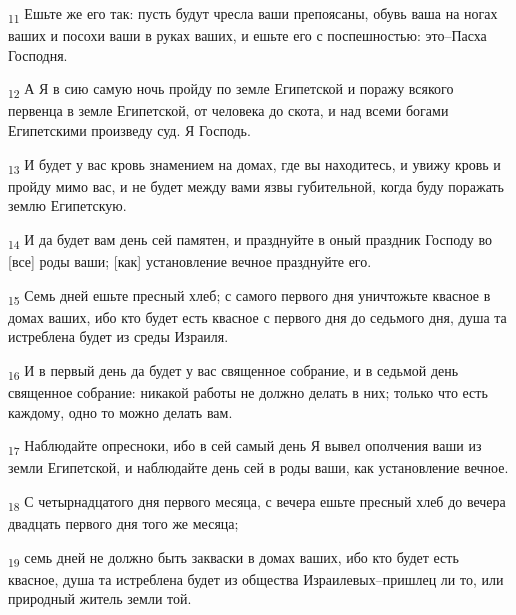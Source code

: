 \begin{tcolorbox}
\textsubscript{11} Ешьте же его так: пусть будут чресла ваши препоясаны, обувь ваша на ногах ваших и посохи ваши в руках ваших, и ешьте его с поспешностью: это--Пасха Господня.
\end{tcolorbox}
\begin{tcolorbox}
\textsubscript{12} А Я в сию самую ночь пройду по земле Египетской и поражу всякого первенца в земле Египетской, от человека до скота, и над всеми богами Египетскими произведу суд. Я Господь.
\end{tcolorbox}
\begin{tcolorbox}
\textsubscript{13} И будет у вас кровь знамением на домах, где вы находитесь, и увижу кровь и пройду мимо вас, и не будет между вами язвы губительной, когда буду поражать землю Египетскую.
\end{tcolorbox}
\begin{tcolorbox}
\textsubscript{14} И да будет вам день сей памятен, и празднуйте в оный праздник Господу во [все] роды ваши; [как] установление вечное празднуйте его.
\end{tcolorbox}
\begin{tcolorbox}
\textsubscript{15} Семь дней ешьте пресный хлеб; с самого первого дня уничтожьте квасное в домах ваших, ибо кто будет есть квасное с первого дня до седьмого дня, душа та истреблена будет из среды Израиля.
\end{tcolorbox}
\begin{tcolorbox}
\textsubscript{16} И в первый день да будет у вас священное собрание, и в седьмой день священное собрание: никакой работы не должно делать в них; только что есть каждому, одно то можно делать вам.
\end{tcolorbox}
\begin{tcolorbox}
\textsubscript{17} Наблюдайте опресноки, ибо в сей самый день Я вывел ополчения ваши из земли Египетской, и наблюдайте день сей в роды ваши, как установление вечное.
\end{tcolorbox}
\begin{tcolorbox}
\textsubscript{18} С четырнадцатого дня первого месяца, с вечера ешьте пресный хлеб до вечера двадцать первого дня того же месяца;
\end{tcolorbox}
\begin{tcolorbox}
\textsubscript{19} семь дней не должно быть закваски в домах ваших, ибо кто будет есть квасное, душа та истреблена будет из общества Израилевых--пришлец ли то, или природный житель земли той.
\end{tcolorbox}

